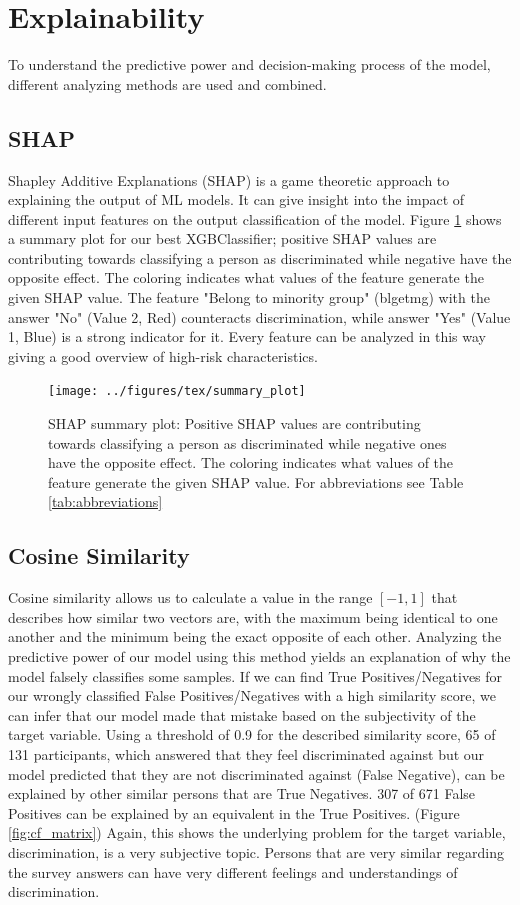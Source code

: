 \documentclass[10pt]{article}
\begin{document}
	\section{Explainability} %
	To understand the predictive power and decision-making process of the model, different analyzing methods are used and combined. 
	\subsection{SHAP}
	Shapley Additive Explanations (SHAP) \cite{NIPS2017_7062} is a game theoretic approach to explaining the output of ML models. It can give insight into the impact of different input features on the output classification of the model. Figure \ref{fig:summary_plot} shows a summary plot for our best XGBClassifier; positive SHAP values are contributing towards classifying a person as discriminated while negative have the opposite effect. The coloring indicates what values of the feature generate the given SHAP value. The feature "Belong to minority group" (blgetmg) with the answer "No" (Value 2, Red) counteracts discrimination, while answer "Yes" (Value 1, Blue) is a strong indicator for it. Every feature can be analyzed in this way giving a good overview of high-risk characteristics.
	\begin{figure}[h]
		\centering
		\texttt{[image: ../figures/tex/summary\_plot]}
		\caption{SHAP summary plot: Positive SHAP values are contributing towards classifying a person as discriminated while negative ones have the opposite effect. The coloring indicates what values of the feature generate the given SHAP value. For abbreviations see Table \ref{tab:abbreviations}}
		\label{fig:summary_plot}
	\end{figure}
	
	\subsection{Cosine Similarity}
	Cosine similarity allows us to calculate a value in the range $[-1,1]$ that describes how similar two vectors are, with the maximum being identical to one another and the minimum being the exact opposite of each other. Analyzing the predictive power of our model using this method yields an explanation of why the model falsely classifies some samples. If we can find True Positives/Negatives for our wrongly classified False Positives/Negatives with a high similarity score, we can infer that our model made that mistake based on the subjectivity of the target variable.
	Using a threshold of 0.9 for the described similarity score, 65 of 131 participants, which answered that they feel discriminated against but our model predicted that they are not discriminated against (False Negative), can be explained by other similar persons that are True Negatives.
	307 of 671 False Positives can be explained by an equivalent in the True Positives. (Figure \ref{fig:cf_matrix})
	Again, this shows the underlying problem for the target variable, discrimination, is a very subjective topic. Persons that are very similar regarding the survey answers can have very different feelings and understandings of discrimination.
	
\end{document}
